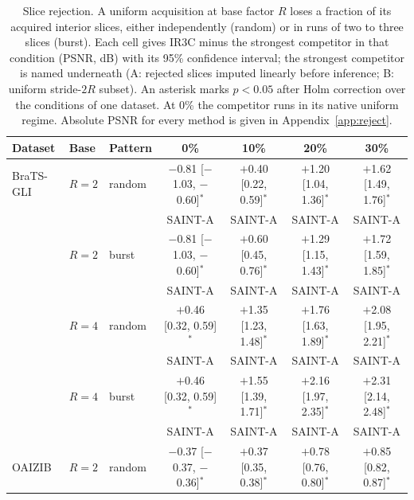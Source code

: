 \begin{table}[pos=t]
\caption{Slice rejection. A uniform acquisition at base factor $R$ loses a fraction of its acquired interior slices, either independently (random) or in runs of two to three slices (burst). Each cell gives IR3C minus the strongest competitor in that condition (PSNR, dB) with its 95\% confidence interval; the strongest competitor is named underneath (A: rejected slices imputed linearly before inference; B: uniform stride-$2R$ subset). An asterisk marks $p<0.05$ after Holm correction over the conditions of one dataset. At 0\% the competitor runs in its native uniform regime. Absolute PSNR for every method is given in Appendix~\ref{app:reject}.}
\label{tab:rejection}
\small
\begin{tabular*}{\textwidth}{@{\extracolsep{\fill}}lllcccc@{}}
\toprule
Dataset & Base & Pattern & 0\% & 10\% & 20\% & 30\% \\
\midrule
BraTS-GLI & $R=2$ & random & $-$0.81 [$-$1.03, $-$0.60]$^{\ast}$ & $+$0.40 [0.22, 0.59]$^{\ast}$ & $+$1.20 [1.04, 1.36]$^{\ast}$ & $+$1.62 [1.49, 1.76]$^{\ast}$ \\
 & & & {\scriptsize\color{black!60}SAINT-A} & {\scriptsize\color{black!60}SAINT-A} & {\scriptsize\color{black!60}SAINT-A} & {\scriptsize\color{black!60}SAINT-A} \\[1pt]
 & $R=2$ & burst & $-$0.81 [$-$1.03, $-$0.60]$^{\ast}$ & $+$0.60 [0.45, 0.76]$^{\ast}$ & $+$1.29 [1.15, 1.43]$^{\ast}$ & $+$1.72 [1.59, 1.85]$^{\ast}$ \\
 & & & {\scriptsize\color{black!60}SAINT-A} & {\scriptsize\color{black!60}SAINT-A} & {\scriptsize\color{black!60}SAINT-A} & {\scriptsize\color{black!60}SAINT-A} \\[1pt]
 & $R=4$ & random & $+$0.46 [0.32, 0.59]$^{\ast}$ & $+$1.35 [1.23, 1.48]$^{\ast}$ & $+$1.76 [1.63, 1.89]$^{\ast}$ & $+$2.08 [1.95, 2.21]$^{\ast}$ \\
 & & & {\scriptsize\color{black!60}SAINT-A} & {\scriptsize\color{black!60}SAINT-A} & {\scriptsize\color{black!60}SAINT-A} & {\scriptsize\color{black!60}SAINT-A} \\[1pt]
 & $R=4$ & burst & $+$0.46 [0.32, 0.59]$^{\ast}$ & $+$1.55 [1.39, 1.71]$^{\ast}$ & $+$2.16 [1.97, 2.35]$^{\ast}$ & $+$2.31 [2.14, 2.48]$^{\ast}$ \\
 & & & {\scriptsize\color{black!60}SAINT-A} & {\scriptsize\color{black!60}SAINT-A} & {\scriptsize\color{black!60}SAINT-A} & {\scriptsize\color{black!60}SAINT-A} \\[1pt]
\midrule
OAIZIB & $R=2$ & random & $-$0.37 [$-$0.37, $-$0.36]$^{\ast}$ & $+$0.37 [0.35, 0.38]$^{\ast}$ & $+$0.78 [0.76, 0.80]$^{\ast}$ & $+$0.85 [0.82, 0.87]$^{\ast}$ \\

\end{tabular*}
\end{table}
